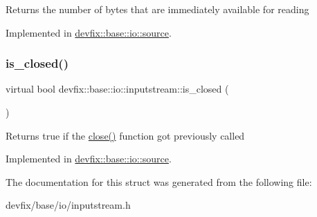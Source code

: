 \begin{DoxyReturn}{Returns}
the number of bytes that are immediately available for reading 
\end{DoxyReturn}


Implemented in \hyperlink{structdevfix_1_1base_1_1io_1_1source_a911f4ba79499a623de30cf16d3d26d47}{devfix\+::base\+::io\+::source}.

\mbox{\label{structdevfix_1_1base_1_1io_1_1inputstream_a9da6b400424ff476ed0479193c219fa9}} 
\subsubsection{\texorpdfstring{is\+\_\+closed()}{is\_closed()}}
{\footnotesize\ttfamily virtual bool devfix\+::base\+::io\+::inputstream\+::is\+\_\+closed (\begin{DoxyParamCaption}{ }\end{DoxyParamCaption})\hspace{0.3cm}{\ttfamily [pure virtual]}}

\begin{DoxyReturn}{Returns}
true if the \hyperlink{structdevfix_1_1base_1_1io_1_1inputstream_a1188eff97757eb9625be91dfeca17af7}{close()} function got previously called 
\end{DoxyReturn}


Implemented in \hyperlink{structdevfix_1_1base_1_1io_1_1source_a406834cf6651d48949b96d0ef49cc6c1}{devfix\+::base\+::io\+::source}.



The documentation for this struct was generated from the following file\+:\begin{DoxyCompactItemize}
\item 
devfix/base/io/inputstream.\+h\end{DoxyCompactItemize}
